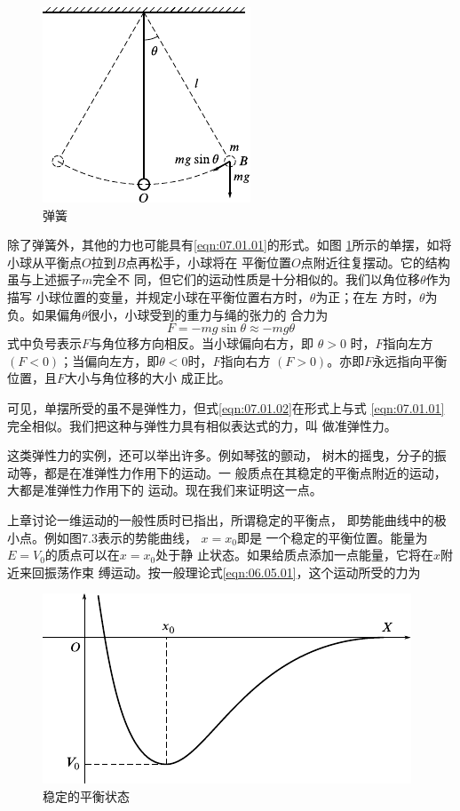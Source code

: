 \begin{figure}
  \centering
  \includegraphics{figure/fig07.02}
  \caption{弹簧}
  \label{fig:07.02}
\end{figure}
除了弹簧外，其他的力也可能具有\eqref{eqn:07.01.01}的形式。如图
\ref{fig:07.02}\;所示的单摆，如将小球从平衡点$ O $拉到$ B $点再松手，小球将在
平衡位置$ O $点附近往复摆动。它的结构虽与上述振子$ m $完全不
同，但它们的运动性质是十分相似的。我们以角位移$ \theta $作为描写
小球位置的变量，并规定小球在平衡位置右方时，$ \theta $为正；在左
方时，$ \theta $为负。如果偏角$ \theta $很小，小球受到的重力与绳的张力的
合力为
\begin{equation}\label{eqn:07.01.02}
  F = - m g \sin \theta \approx - m g \theta
\end{equation}
式中负号表示$ F $与角位移方向相反。当小球偏向右方，即 $ \theta > 0  $
时，$ F $指向左方$ \left( F < 0 \right) $；当偏向左方，即$  \theta < 0   $时，$ F $指向右方
$ \left( F > 0 \right) $。亦即$ F $永远指向平衡位置，且$ F $大小与角位移的大小
成正比。

可见，单摆所受的虽不是弹性力，但式\eqref{eqn:07.01.02}在形式上与式
\eqref{eqn:07.01.01}完全相似。我们把这种与弹性力具有相似表达式的力，叫
做准弹性力。

这类弹性力的实例，还可以举出许多。例如琴弦的颤动，
树木的摇曳，分子的振动等，都是在准弹性力作用下的运动。一
般质点在其稳定的平衡点附近的运动，大都是准弹性力作用下的
运动。现在我们来证明这一点。

\clearpage
上章讨论一维运动的一般性质时已指出，所谓稳定的平衡点，
即势能曲线中的极小点。例如图7.3表示的势能曲线， $ x = x _ { 0 }   $即是
一个稳定的平衡位置。能量为$ E = V _ 0 $的质点可以在$  x = x _ { 0 }   $处于静
止状态。如果给质点添加一点能量，它将在$ x $附近来回振荡作束
缚运动。按一般理论式\eqref{eqn:06.05.01}，这个运动所受的力为

\begin{figure}[h]
  \centering
  \includegraphics{figure/fig07.03}
  \caption{稳定的平衡状态}
  \label{fig:07.03}
\end{figure}

